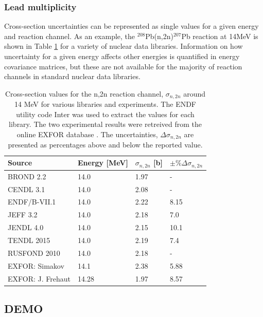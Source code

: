 \subsubsection{Lead multiplicity}

Cross-section uncertainties can be represented as single values for a given energy and reaction channel. As an example, the $^{208}$Pb(n,2n)$^{207}$Pb reaction at 14MeV is shown in Table \ref{tab:lead_by_lib} for a variety of nuclear data libraries. Information on how uncertainty for a given energy affects other energies is quantified in energy covariance matrices, but these are not available for the majority of reaction channels in standard nuclear data libraries.

\begin{table}[ht]
  \footnotesize
  \centering
  \begin{tabularx}{\textwidth}{XXXX}
    \toprule
    Source & Energy [MeV] & $\sigma_{n,2n}$ [b] & $\pm\%\Delta\sigma_{n,2n}$ \\
    \midrule
    BROND 2.2 & 14.0 & 1.97 & - \\
    CENDL 3.1 & 14.0 & 2.08 & - \\
    ENDF/B-VII.1 & 14.0 & 2.22 & 8.15 \\
    JEFF 3.2 & 14.0 & 2.18 & 7.0 \\
    JENDL 4.0 & 14.0 & 2.15 & 10.1 \\
    TENDL 2015 & 14.0 & 2.19 & 7.4 \\
    RUSFOND 2010 & 14.0 & 2.18 & - \\
    EXFOR: Simakov & 14.1 & 2.38 & 5.88 \\
    EXFOR: J. Frehaut & 14.28 & 1.97 & 8.57 \\
    \bottomrule
  \end{tabularx}
  \caption{Cross-section values for the n,2n reaction channel, $\sigma_{n,2n}$ around 14 MeV for various libraries and experiments. The ENDF utility code Inter \cite{inter} was used to extract the values for each library. The two experimental results were retreived from the online EXFOR database \cite{exfor2017}. The uncertainties, $\Delta\sigma_{n,2n}$ are presented as percentages above and below the reported value.}
  \label{tab:lead_by_lib}
\end{table}

\FloatBarrier
\subsection{DEMO}

